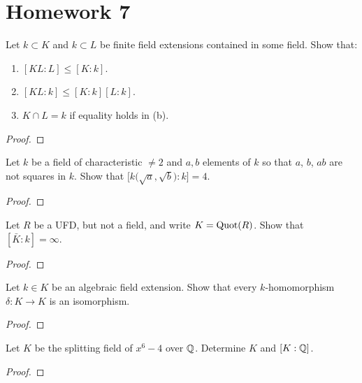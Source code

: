 \chapter{Homework 7}
\begin{problem}
Let $k\subset K$ and $k\subset L$ be finite field extensions contained in
some field. Show that:
\begin{enumerate}[label=(\alph*)]
\item $[KL:L]\leq [K:k]$.
\item $[KL:k]\leq [K:k][L:k]$.
\item $K\cap L=k$ if equality holds in (b).
\end{enumerate}
\end{problem}
\begin{proof}
\end{proof}

\begin{problem}
Let $k$ be a field of characteristic $\neq 2$ and $a,b$ elements of $k$ so
that $a$, $b$, $ab$ are not squares in $k$. Show that
$\bigl[k\bigl(\sqrt{a},\sqrt{b}\bigr):k\bigr]=4$.
\end{problem}
\begin{proof}
\end{proof}

\begin{problem}
Let $R$ be a UFD, but not a field, and write $K=\operatorname{Quot}(R)$. Show that $[\bar
K:k]=\infty$.
\end{problem}
\begin{proof}
\end{proof}

\begin{problem}
Let $k\in K$ be an algebraic field extension. Show that every
$k$-homomorphism $\delta\colon K\to K$ is an isomorphism.
\end{problem}
\begin{proof}
\end{proof}

\begin{problem}
Let $K$ be the splitting field of $x^6-4$ over $\mathbb{Q}$. Determine $K$ and
$[K:\mathbb{Q}]$.
\end{problem}
\begin{proof}
\end{proof}

